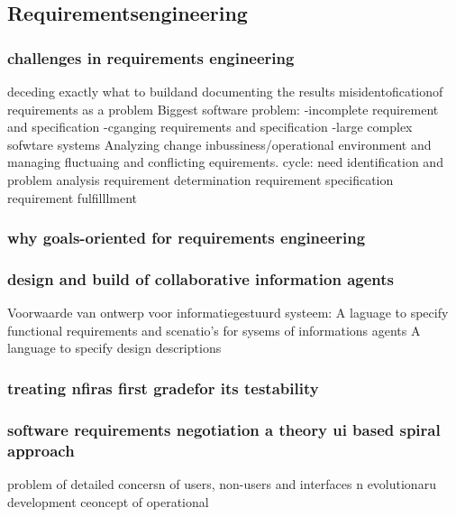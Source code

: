 \subsection{Requirementsengineering}

 \cite{jonkerTreurKlush200informativeAgents}
\cite{boehmBoseLeeRequirementsNegotiations}
\cite{muHungJinLiu2013inconsistencyReqs}
\cite{hunterNuseibeh1996manageSpecs}
\cite{myloloupos1992representingReqs}
\cite{zavePamela4darkCorners}
\cite{zavePAmela1997regEngineering}

\subsubsection{challenges in requirements engineering}
deceding exactly what to buildand documenting the results
misidentoficationof requirements as a problem
Biggest software problem:
-incomplete requirement and specification
-cganging requirements and specification
-large complex sofwtare systems
Analyzing change inbussiness/operational environment and managing fluctuaing and conflicting equirements.
cycle:
need identification and problem analysis
requirement determination
requirement specification
requirement fulfilllment

\subsubsection{why goals-oriented for requirements engineering}

\subsubsection{design and build of collaborative information agents}
Voorwaarde van ontwerp voor informatiegestuurd systeem:
A laguage to specify functional requirements and scenatio's for sysems of informations agents
A language to specify design descriptions
\subsubsection{treating nfiras first gradefor its testability}

\subsubsection{software requirements negotiation a theory ui based spiral approach}
problem of detailed concersn of users, non-users and interfaces n evolutionaru development
ceoncept of operational

